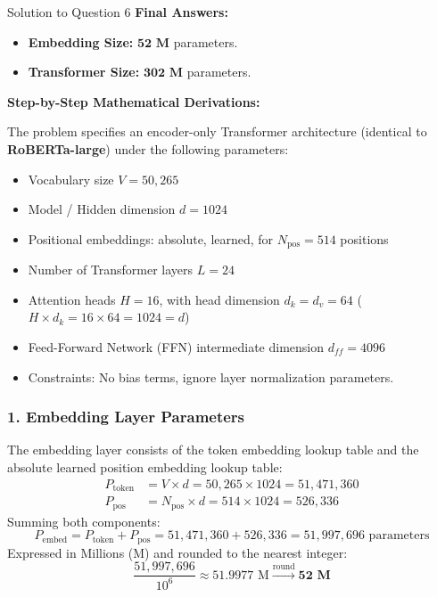 \documentclass[11pt,a4paper]{article}
\begin{document}
\bigskip

\begin{solutionbox}{Solution to Question 6}
\textbf{Final Answers:}
\begin{itemize}
    \item \textbf{Embedding Size:} $\mathbf{52 \text{ M}}$ parameters.
    \item \textbf{Transformer Size:} $\mathbf{302 \text{ M}}$ parameters.
\end{itemize}

\medskip
\textbf{Step-by-Step Mathematical Derivations:}

The problem specifies an encoder-only Transformer architecture (identical to \textbf{RoBERTa-large}) under the following parameters:
\begin{itemize}
    \item Vocabulary size $V = 50,265$
    \item Model / Hidden dimension $d = 1024$
    \item Positional embeddings: absolute, learned, for $N_{\text{pos}} = 514$ positions
    \item Number of Transformer layers $L = 24$
    \item Attention heads $H = 16$, with head dimension $d_k = d_v = 64$ ($H \times d_k = 16 \times 64 = 1024 = d$)
    \item Feed-Forward Network (FFN) intermediate dimension $d_{ff} = 4096$
    \item Constraints: No bias terms, ignore layer normalization parameters.
\end{itemize}

\subsubsection*{1. Embedding Layer Parameters}
The embedding layer consists of the token embedding lookup table and the absolute learned position embedding lookup table:
\begin{align*}
P_{\text{token}} &= V \times d = 50,265 \times 1024 = 51,471,360 \\
P_{\text{pos}} &= N_{\text{pos}} \times d = 514 \times 1024 = 526,336
\end{align*}
Summing both components:
\[
P_{\text{embed}} = P_{\text{token}} + P_{\text{pos}} = 51,471,360 + 526,336 = 51,997,696 \text{ parameters}
\]
Expressed in Millions (M) and rounded to the nearest integer:
\[
\frac{51,997,696}{10^6} \approx 51.9977 \text{ M} \xrightarrow{\text{round}} \mathbf{52 \text{ M}}
\]


\end{solutionbox}
\end{document}
